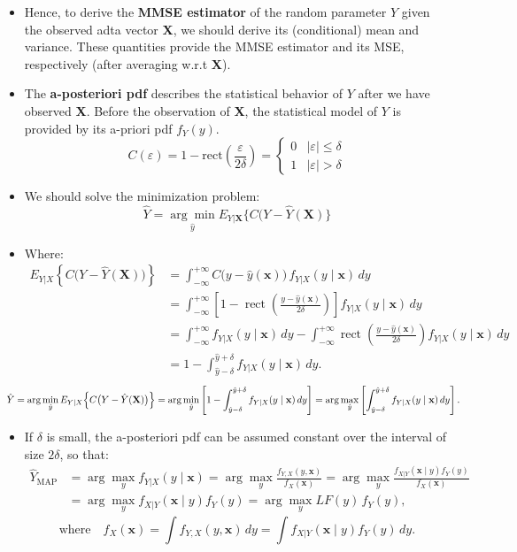 \begin{itemize}
\item Hence, to derive the \textbf{MMSE estimator} of the random parameter \(Y\) given the observed adta vector \textbf{X}, we should derive its (conditional) mean and variance. These quantities provide the MMSE estimator and its MSE, respectively (after averaging w.r.t \textbf{X}).
\item The \textbf{a-posteriori pdf} describes the statistical behavior of \(Y\) after we have observed \textbf{X}. Before the observation of \textbf{X}, the statistical model of \(Y\) is provided by its a-priori pdf \(f_Y(y)\).
\[
C(\varepsilon)=1-\text{rect}\left(\frac{\varepsilon}{2\delta}\right)=
\begin{cases}
    0 &|\varepsilon|\leq\delta \\[4pt]
    1 &|\varepsilon|>\delta
\end{cases}
\]
\item We should solve the minimization problem:
\[
\hat{Y}=\underset{\hat{y}}{\arg\min}E_{Y|\mathbf{X}}\{C(Y-\hat{Y}(\mathbf{X})\}
\]
\item Where:
\begin{align*}
E_{Y|X}\!\left\{ C\bigl(Y - \hat{Y}(\mathbf{X})\bigr) \right\}
&= \int_{-\infty}^{+\infty}
   C\bigl(y - \hat{y}(\mathbf{x})\bigr) \,
   f_{Y|X}(y \mid \mathbf{x}) \, dy \\[4pt]
&= \int_{-\infty}^{+\infty}
   \left[ 1 - \operatorname{rect}
      \!\left(\frac{y - \hat{y}(\mathbf{x})}{2\delta}\right) \right]
   f_{Y|X}(y \mid \mathbf{x}) \, dy \\[4pt]
&= \int_{-\infty}^{+\infty}
   f_{Y|X}(y \mid \mathbf{x}) \, dy
   - \int_{-\infty}^{+\infty}
     \operatorname{rect}\!\left(\frac{y - \hat{y}(\mathbf{x})}{2\delta}\right)
     f_{Y|X}(y \mid \mathbf{x}) \, dy \\[4pt]
&= 1 - \int_{\hat{y}-\delta}^{\hat{y}+\delta}
        f_{Y|X}(y \mid \mathbf{x}) \, dy .
\end{align*}
\begin{align*}\hspace{-2em}
\hat{Y}
&= \arg\min_{\hat{y}} E_{Y|X}\!\left\{
   C\bigl(Y - \hat{Y}(\mathbf{X})\bigr) \right\} = \arg\min_{\hat{y}}
   \left[ 1 - \int_{\hat{y}-\delta}^{\hat{y}+\delta}
      f_{Y|X}(y \mid \mathbf{x}) \, dy \right] = \arg\max_{\hat{y}}
   \left[ \int_{\hat{y}-\delta}^{\hat{y}+\delta}
      f_{Y|X}(y \mid \mathbf{x}) \, dy \right].
\end{align*}


\item If \(\delta\) is small, the a-posteriori pdf can be assumed constant over the interval of size \(2\delta\), so that:
\begin{align*}
\hat{Y}_{\text{MAP}}
&= \arg\max_{y} f_{Y|X}(y \mid \mathbf{x})
 = \arg\max_{y} \frac{f_{Y,X}(y,\mathbf{x})}{f_X(\mathbf{x})}
 = \arg\max_{y} \frac{f_{X|Y}(\mathbf{x} \mid y) f_Y(y)}{f_X(\mathbf{x})} \\[4pt]
&= \arg\max_{y} f_{X|Y}(\mathbf{x} \mid y) f_Y(y)
 = \arg\max_{y} LF(y)\, f_Y(y),
\end{align*}
\[
\text{where} \quad
f_X(\mathbf{x}) = \int f_{Y,X}(y,\mathbf{x}) \, dy
 = \int f_{X|Y}(\mathbf{x} \mid y) f_Y(y) \, dy .
\]


\end{itemize}
